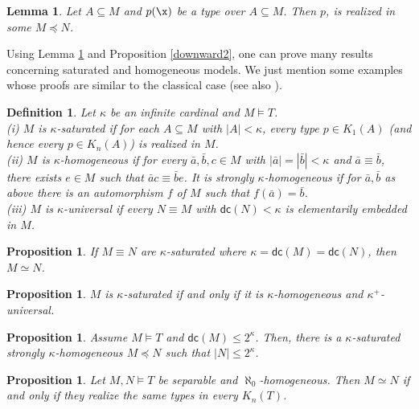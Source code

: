 \documentclass[12pt]{article}
\newtheorem{lemma}[theorem]{Lemma}
\newtheorem{proposition}[theorem]{Proposition}
\newtheorem{definition}[theorem]{Definition}
\def\a{\bar {a}}\def\b{\bar {b}}\def\c{\bar {c}}
\begin{document}
\begin{lemma}
\label{realize}Let $A\subseteq M$ and $p(\x)$ be a type over $A\subseteq M$. Then $p$, is realized in some $M\preccurlyeq N$.
\end{lemma}

Using Lemma \ref{realize} and Proposition \ref{downward2}, one can prove many results concerning saturated and homogeneous models.
We just mention some examples whose proofs are similar to the classical case (see also \cite{ACMT}).

\begin{definition}
\emph{Let $\kappa$ be an infinite cardinal and $M\vDash T$.\\
\emph{(i)} $M$ is $\kappa$-\emph{saturated} if for each $A\subseteq M$
with $|A|<\kappa$, every type $p\in K_1(A)$ (and hence every $p\in K_n(A)$) is realized in $M$.\\
\emph{(ii)} $M$ is $\kappa$-\emph{homogeneous} if for every $\a,\b,c\in M$
with $|\a|=|\b|<\kappa$ and $\a\equiv\b$, there exists $e\in M$ such that $\a c\equiv\b e$.
It is \emph{strongly $\kappa$-homogeneous} if for $\a,\b$ as above there is an automorphism $f$ of $M$ such that $f(\a)=\b$.\\
\emph{(iii)} $M$ is $\kappa$-\emph{universal} if every $N\equiv M$ with $\mathsf{dc}(N)<\kappa$ is elementarily embedded in $M$.}
\end{definition}

\begin{proposition}
If $M\equiv N$ are $\kappa$-saturated where $\kappa=\mathsf{dc}(M)=\mathsf{dc}(N)$, then $M\simeq N$.
\end{proposition}

\begin{proposition}
$M$ is $\kappa$-saturated if and only if it is $\kappa$-homogeneous and $\kappa^+$-universal.
\end{proposition}

\begin{proposition} \label{homogeneous2}
Assume $M\vDash T$ and $\mathsf{dc}(M)\leqslant2^{\kappa}$.
Then, there is a $\kappa$-saturated strongly $\kappa$-homogeneous $M\preccurlyeq N$ such that $|N|\leqslant2^{\kappa}$.
\end{proposition}

\begin{proposition}\label{homogeneous}
Let $M,N\vDash T$ be separable and $\aleph_0$-homogeneous.
Then $M\simeq N$ if and only if they realize the same types in every $K_n(T)$.
\end{proposition}
\end{document}
